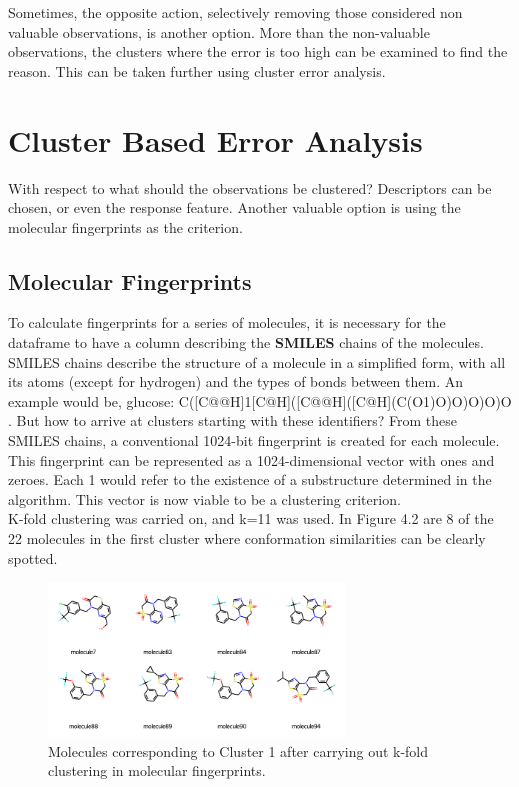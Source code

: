 Sometimes, the opposite action, selectively removing those considered non valuable observations, is another option. More than the non-valuable observations, the clusters where the error is too high can be examined to find the reason. This can be taken further using cluster error analysis.
\section*{Cluster Based Error Analysis}
With respect to what should the observations be clustered? Descriptors can be chosen, or even the response feature. Another valuable option is using the molecular fingerprints as the criterion.
\subsection*{Molecular Fingerprints}
To calculate fingerprints for a series of molecules, it is necessary for the dataframe to have a column describing the \textbf{SMILES} chains of the molecules. SMILES chains describe the structure of a molecule in a simplified form, with all its atoms (except for hydrogen) and the types of bonds between them. An example would be, glucose: C([C@@H]1[C@H]([C@@H]([C@H](C(O1)O)O)O)O)O . But how to arrive at clusters starting with these identifiers? From these SMILES chains, a conventional 1024-bit fingerprint is created for each molecule. This fingerprint can be represented as a 1024-dimensional vector with ones and zeroes. Each 1 would refer to the existence of a substructure determined in the algorithm. This vector is now viable to be a clustering criterion.\\

K-fold clustering was carried on, and k=11 was used. In Figure 4.2 are 8 of the 22 molecules in the first cluster where conformation similarities can be clearly spotted.
\begin{figure}[h!]
    \centering
    \includegraphics[width=0.7\textwidth]{Images/Discussion/clusterfinger.png}
    \caption{Molecules corresponding to Cluster 1 after carrying out k-fold clustering in molecular fingerprints.}
\end{figure}

